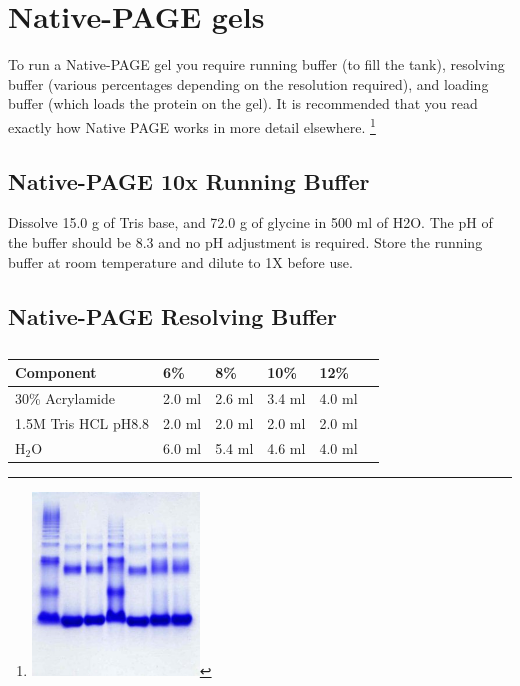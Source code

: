 \documentclass{tufte-book} %
\begin{document}
\newpage
\section{Native-PAGE gels}

To run a Native-PAGE gel you require running buffer (to fill the tank), resolving buffer (various percentages depending on the resolution required), and loading buffer (which loads the protein on the gel). It is recommended that you read exactly how Native PAGE works in more detail elsewhere. \footnote{ \includegraphics[width=0.35\textwidth]{nativegel}}

\subsection{Native-PAGE 10x Running Buffer}

Dissolve 15.0 g of Tris base, and 72.0 g of glycine in 500 ml of H2O. The pH of the buffer should be 8.3 and no pH adjustment is required. Store the running buffer at room temperature and dilute to 1X before use.

\subsection{Native-PAGE Resolving Buffer}



\begin{table}[ht]
  \centering
  \selectfont
  \begin{tabular}{llllll}
    \toprule
    Component & 6\% & 8\% & 10\% & 12\% \\
    \midrule
   30\% Acrylamide		& 2.0 ml & 2.6 ml & 3.4 ml & 4.0 ml \\
   1.5M Tris HCL pH8.8 	& 2.0 ml & 2.0 ml & 2.0 ml & 2.0 ml	\\
    H$_{2}$O 			& 6.0 ml & 5.4 ml & 4.6 ml & 4.0 ml \\

    \bottomrule
  \end{tabular}
  \caption{}
  \label{tab:res}
\end{table}
\end{document}
